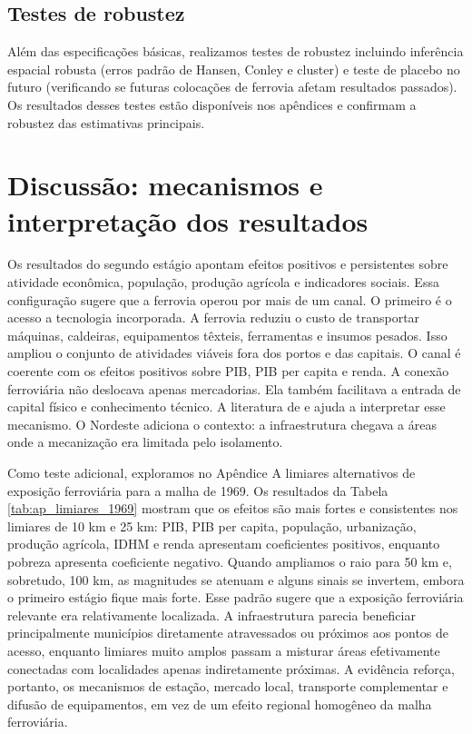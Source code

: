 \documentclass[12pt,a4paper]{article}
\begin{document}
\subsection{Testes de robustez}
Além das especificações básicas, realizamos testes de robustez incluindo inferência espacial robusta (erros padrão de Hansen, Conley e cluster) e teste de placebo no futuro (verificando se futuras colocações de ferrovia afetam resultados passados). Os resultados desses testes estão disponíveis nos apêndices e confirmam a robustez das estimativas principais.
\section{Discussão: mecanismos e interpretação dos resultados}

Os resultados do segundo estágio apontam efeitos positivos e persistentes sobre atividade econômica, população, produção agrícola e indicadores sociais. Essa configuração sugere que a ferrovia operou por mais de um canal. O primeiro é o acesso a tecnologia incorporada. A ferrovia reduziu o custo de transportar máquinas, caldeiras, equipamentos têxteis, ferramentas e insumos pesados. Isso ampliou o conjunto de atividades viáveis fora dos portos e das capitais. O canal é coerente com os efeitos positivos sobre PIB, PIB per capita e renda. A conexão ferroviária não deslocava apenas mercadorias. Ela também facilitava a entrada de capital físico e conhecimento técnico. A literatura de \citet{atack2010} e \citet{hornung2015} ajuda a interpretar esse mecanismo. O Nordeste adiciona o contexto: a infraestrutura chegava a áreas onde a mecanização era limitada pelo isolamento.

Como teste adicional, exploramos no Apêndice A limiares alternativos de exposição ferroviária para a malha de 1969. Os resultados da Tabela \ref{tab:ap_limiares_1969} mostram que os efeitos são mais fortes e consistentes nos limiares de 10 km e 25 km: PIB, PIB per capita, população, urbanização, produção agrícola, IDHM e renda apresentam coeficientes positivos, enquanto pobreza apresenta coeficiente negativo. Quando ampliamos o raio para 50 km e, sobretudo, 100 km, as magnitudes se atenuam e alguns sinais se invertem, embora o primeiro estágio fique mais forte. Esse padrão sugere que a exposição ferroviária relevante era relativamente localizada. A infraestrutura parecia beneficiar principalmente municípios diretamente atravessados ou próximos aos pontos de acesso, enquanto limiares muito amplos passam a misturar áreas efetivamente conectadas com localidades apenas indiretamente próximas. A evidência reforça, portanto, os mecanismos de estação, mercado local, transporte complementar e difusão de equipamentos, em vez de um efeito regional homogêneo da malha ferroviária.
\end{document}
